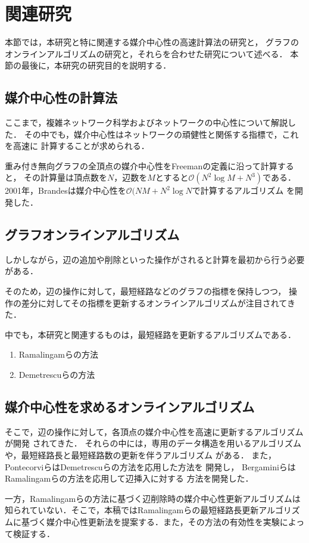 \section{関連研究}
本節では，本研究と特に関連する媒介中心性の高速計算法の研究と，
グラフのオンラインアルゴリズムの研究と，それらを合わせた研究について述べる．
本節の最後に，本研究の研究目的を説明する．

\subsection{媒介中心性の計算法}
ここまで，複雑ネットワーク科学およびネットワークの中心性について解説した．
その中でも，媒介中心性はネットワークの頑健性と関係する指標で，これを高速に
計算することが求められる．

重み付き無向グラフの全頂点の媒介中心性をFreemanの定義に沿って計算すると，
その計算量は頂点数を$N$，辺数を$M$とすると$\mathcal{O}(N^2\log M+N^3)$である．
2001年，Brandesは媒介中心性を$\mathcal{O}(NM+N^2\log N$で計算するアルゴリズム
\cite{Brandes2001}を開発した．

\subsection{グラフオンラインアルゴリズム}
しかしながら，辺の追加や削除といった操作がされると計算を最初から行う必要がある．

そのため，辺の操作に対して，最短経路などのグラフの指標を保持しつつ，
操作の差分に対してその指標を更新するオンラインアルゴリズムが注目されてきた．

中でも，本研究と関連するものは，最短経路を更新するアルゴリズムである．

\begin{enumerate}
\item Ramalingamらの方法\cite{Ramalingam1996}
\item Demetrescuらの方法\cite{Demetrescu2003}
\end{enumerate}

\subsection{媒介中心性を求めるオンラインアルゴリズム}

そこで，辺の操作に対して，各頂点の媒介中心性を高速に更新するアルゴリズムが開発
されてきた．
それらの中には，専用のデータ構造を用いるアルゴリズム\cite{Lee2012,Hayashi2015}
や，最短経路長と最短経路数の更新を伴うアルゴリズム
\cite{Pontecorvi2015,Bergamini2017}がある．
また，PontecorviらはDemetrescuらの方法を応用した方法を
開発し\cite{Pontecorvi2015}，
BergaminiらはRamalingamらの方法を応用して辺挿入に対する
方法を開発した\cite{Bergamini2017}．

一方，Ramalingamらの方法に基づく辺削除時の媒介中心性更新アルゴリズムは知られていない．そこで，本稿ではRamalingamらの最短経路長更新アルゴリズムに基づく媒介中心性更新法を提案する．また，その方法の有効性を実験によって検証する．

